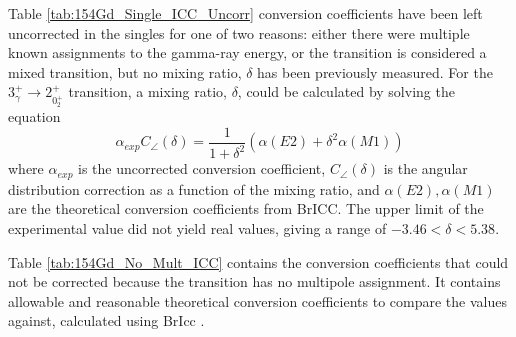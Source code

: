 Table \ref{tab:154Gd_Single_ICC_Uncorr} conversion coefficients have been left uncorrected in the singles for one of two reasons: either there were multiple known assignments to the gamma-ray energy, or the transition is considered a mixed transition, but no mixing ratio, $\delta$ has been previously measured. For the $3^{+}_{\gamma}\rightarrow 2^+_{0^+_2}$ transition, a mixing ratio, $\delta$, could be calculated by solving the equation
\begin{equation}
    \alpha_{exp}C_{\angle}(\delta)=\frac{1}{1+\delta^2}(\alpha(E2)+\delta^2\alpha(M1))
\end{equation}
where $\alpha_{exp}$ is the uncorrected conversion coefficient, $C_{\angle}(\delta)$ is the angular distribution correction as a function of the mixing ratio, and $\alpha(E2),\alpha(M1)$ are the theoretical conversion coefficients from BrICC\citep{kibedi08:_BRICC}. The upper limit of the experimental value did not yield real values, giving a range of  $-3.46 < \delta < 5.38$.

Table \ref{tab:154Gd_No_Mult_ICC} contains the conversion coefficients that could not be corrected because the transition has no multipole assignment. It contains allowable and reasonable theoretical conversion coefficients to compare the values against, calculated using BrIcc \cite{kibedi08:_BRICC}.

\afterpage{\clearpage}

\afterpage{\clearpage}

\afterpage{\clearpage}   

